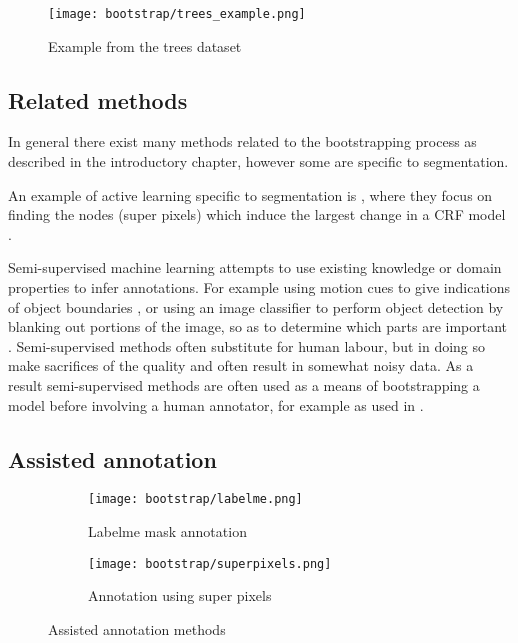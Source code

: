 \begin{figure}[ht]
\centering
\texttt{[image: bootstrap/trees\_example.png]}

\caption{Example from the trees dataset}
\label{fig:bootstrap_tree}
\end{figure}

\subsection{Related methods}


In general there exist many methods related to the bootstrapping process as described in the introductory chapter, however some are specific to segmentation.  

An example of active learning specific to segmentation is \cite{Xu2017}, where they focus on finding the nodes (super pixels) which induce the largest change in a \gls{CRF} model .




Semi-supervised machine learning attempts to use existing knowledge or domain properties to infer annotations. For example using motion cues to give indications of object boundaries \cite{Hong2017}, or using an image classifier to perform object detection by blanking out portions of the image, so as to determine which parts are important \cite{Bazzani2016}. Semi-supervised methods often substitute for human labour, but in doing so make sacrifices of the quality and often result in somewhat noisy data. As a result semi-supervised methods are often used as a means of bootstrapping a model before involving a human annotator, for example as used in \cite{Papadopoulos2016}.


\subsection {Assisted annotation}


\begin{figure}[ht]
\centering
\begin{subfigure}{.25\textwidth}
  \centering
  \texttt{[image: bootstrap/labelme.png]}
  \caption{Labelme mask annotation}  
  \label{fig:bootstrap_labelme}
\end{subfigure}%
\begin{subfigure}{.25\textwidth}
  \centering
  \texttt{[image: bootstrap/superpixels.png]}
  \caption{Annotation using super pixels}
  \label{fig:bootstrap_superpixels}
\end{subfigure}

\caption{Assisted annotation methods}
\label{fig:bootstrap_annot_method}
\end{figure}


